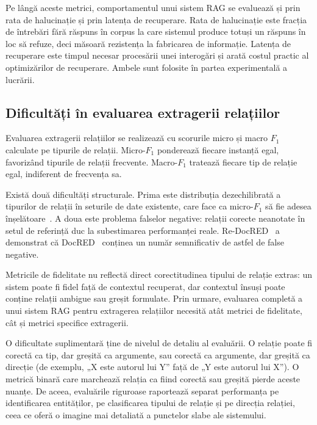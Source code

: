 Pe lângă aceste metrici, comportamentul unui sistem RAG se evaluează și prin rata de halucinație și prin latența de recuperare. Rata de halucinație este fracția de întrebări fără răspuns în corpus la care sistemul produce totuși un răspuns în loc să refuze, deci măsoară rezistența la fabricarea de informație. Latența de recuperare este timpul necesar procesării unei interogări și arată costul practic al optimizărilor de recuperare. Ambele sunt folosite în partea experimentală a lucrării.

\subsection{Dificultăți în evaluarea extragerii relațiilor}

Evaluarea extragerii relațiilor se realizează cu scorurile micro și macro $F_1$ calculate pe tipurile de relații. Micro-$F_1$ ponderează fiecare instanță egal, favorizând tipurile de relații frecvente. Macro-$F_1$ tratează fiecare tip de relație egal, indiferent de frecvența sa.

Există două dificultăți structurale. Prima este distribuția dezechilibrată a tipurilor de relații în seturile de date existente, care face ca micro-$F_1$ să fie adesea înșelătoare~\cite{tan2022redocred}. A doua este problema falselor negative: relații corecte neanotate în setul de referință duc la subestimarea performanței reale. Re-DocRED~\cite{tan2022redocred} a demonstrat că DocRED~\cite{yao2019docred} conținea un număr semnificativ de astfel de false negative.

Metricile de fidelitate nu reflectă direct corectitudinea tipului de relație extras: un sistem poate fi fidel față de contextul recuperat, dar contextul însuși poate conține relații ambigue sau greșit formulate. Prin urmare, evaluarea completă a unui sistem RAG pentru extragerea relațiilor necesită atât metrici de fidelitate, cât și metrici specifice extragerii.

O dificultate suplimentară ține de nivelul de detaliu al evaluării. O relație poate fi corectă ca tip, dar greșită ca argumente, sau corectă ca argumente, dar greșită ca direcție (de exemplu, „X este autorul lui Y” față de „Y este autorul lui X”). O metrică binară care marchează relația ca fiind corectă sau greșită pierde aceste nuanțe. De aceea, evaluările riguroase raportează separat performanța pe identificarea entităților, pe clasificarea tipului de relație și pe direcția relației, ceea ce oferă o imagine mai detaliată a punctelor slabe ale sistemului.

